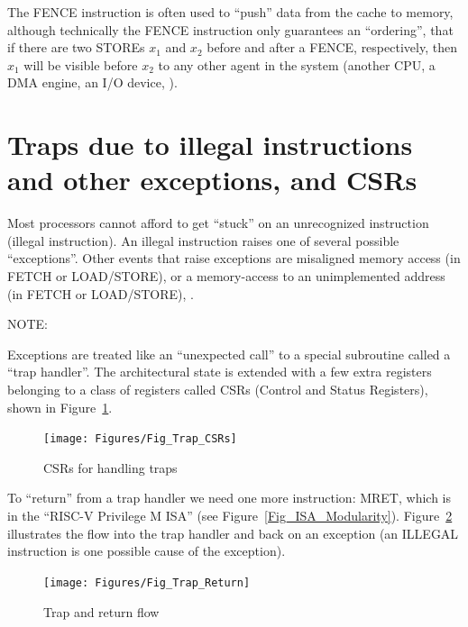 The FENCE instruction is often used to ``push'' data from the cache to
memory, although technically the FENCE instruction only guarantees an
``ordering'', {\ie} that if there are two STOREs $x_1$ and $x_2$
before and after a FENCE, respectively, then $x_1$ will be visible
before $x_2$ to any other agent in the system (another CPU, a DMA
engine, an I/O device, {\etc}).


\section{Traps due to illegal instructions and other exceptions, and CSRs}

\label{Sec_Traps}

Most processors cannot afford to get ``stuck'' on an unrecognized
instruction (illegal instruction).  An illegal instruction raises one
of several possible ``exceptions''.  Other events that raise
exceptions are misaligned memory access (in FETCH or LOAD/STORE), or a
memory-access to an unimplemented address (in FETCH or LOAD/STORE),
{\etc}.

\vspace{2ex}

NOTE: 

\vspace{2ex}

Exceptions are treated like an ``unexpected call'' to a special
subroutine called a ``trap handler''.  The architectural state is
extended with a few extra registers belonging to a class of registers
called CSRs (Control and Status Registers), shown in
Figure~\ref{Fig_Trap_CSRs}.
\begin{figure}[htbp]
  \centerline{\texttt{[image: Figures/Fig\_Trap\_CSRs]}}
  \caption{\label{Fig_Trap_CSRs} CSRs for handling traps}
\end{figure}

To ``return'' from a trap handler we need one more instruction: MRET,
which is in the ``RISC-V Privilege M ISA'' (see
Figure~\ref{Fig_ISA_Modularity}).  Figure~\ref{Fig_Trap_Return}
illustrates the flow into the trap handler and back on an exception
(an ILLEGAL instruction is one possible cause of the exception).
\begin{figure}[htbp]
  \centerline{\texttt{[image: Figures/Fig\_Trap\_Return]}}
  \caption{\label{Fig_Trap_Return} Trap and return flow}
\end{figure}

